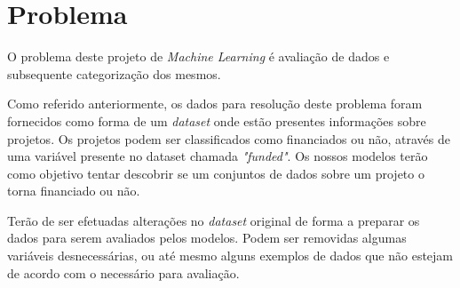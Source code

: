 \section*{Problema}

O problema deste projeto de \textit{Machine Learning} é avaliação de  dados e subsequente categorização dos mesmos.

Como referido anteriormente, os dados para resolução deste problema foram fornecidos como forma de um \textit{dataset} onde estão presentes informações sobre projetos. Os projetos podem ser classificados como financiados ou não, através de uma variável presente no dataset chamada \textit{"funded"}. Os nossos modelos terão como objetivo tentar descobrir se um conjuntos de dados sobre um projeto o torna financiado ou não.

Terão de ser efetuadas alterações no \textit{dataset} original de forma a preparar os dados para serem avaliados pelos modelos. Podem ser removidas algumas variáveis desnecessárias, ou até mesmo alguns exemplos de dados que não estejam de acordo com o necessário para avaliação.

